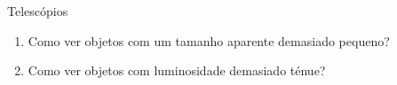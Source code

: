 \documentclass[beamer,9pt,aspectratio=169]{beamer}
\begin{document}
\begin{frame}{Telescópios}
  \begin{minipage}[t]{0.6\linewidth}
  \vspace{5em}
  \begin{enumerate}[<.->]
    \setlength{\itemsep}{4em}
    \item Como ver objetos com um tamanho aparente demasiado pequeno?
    \item Como ver objetos com luminosidade demasiado ténue?
  \end{enumerate}
  \end{minipage}\hfill
\end{frame}
\end{document}
